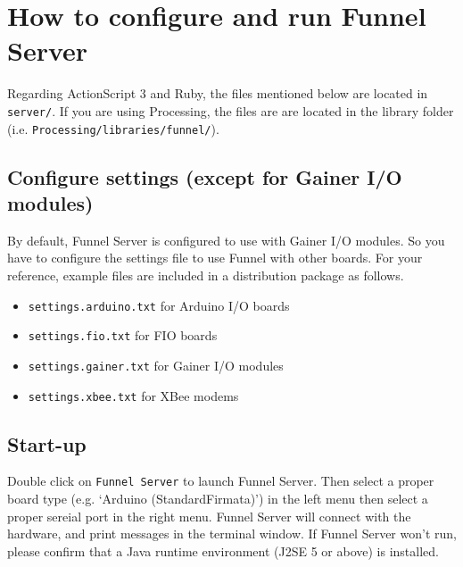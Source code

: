 \documentclass[9pt]{jsarticle}
\begin{document}
\clearpage
\section{How to configure and run Funnel Server}
Regarding ActionScript 3 and Ruby, the files mentioned below are located in \texttt{server/}. If you are using Processing, the files are are located in the library folder (i.e. \texttt{Processing/libraries/funnel/}). 



\subsection{Configure settings (except for Gainer I/O modules)}
By default, Funnel Server is configured to use with Gainer I/O modules. So you have to configure the settings file to use Funnel with other boards. For your reference, example files are included in a distribution package as follows.
\begin{itemize}
\item \texttt{settings.arduino.txt} for Arduino I/O boards
\item \texttt{settings.fio.txt} for FIO boards
\item \texttt{settings.gainer.txt} for Gainer I/O modules
\item \texttt{settings.xbee.txt} for XBee modems
\end{itemize}


\subsection{Start-up}
Double click on \texttt{Funnel Server} to launch Funnel Server. Then select a proper board type (e.g. `Arduino (StandardFirmata)') in the left menu then select a proper sereial port in the right menu. Funnel Server will connect with the hardware, and print messages in the terminal window. If Funnel Server won't run, please confirm that a Java runtime environment (J2SE 5 or above) is installed.
\end{document}
